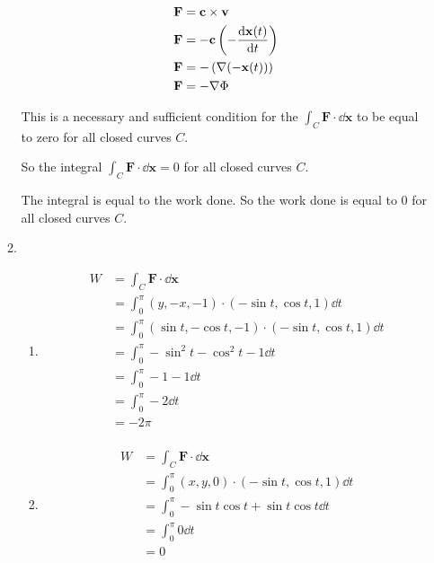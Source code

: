 \documentclass[10pt,\jkfside,a4paper]{article}
\begin{document}
\begin{enumerate}
\begin{enumerate}[label=(\roman*)]
\begin{equation}
\begin{split}
\mathbf{F} &= \mathbf{c}\times\mathbf{v} \\
\mathbf{F} &= -\mathbf{c}\left(-\dv{\mathbf{x}(t)}{t}\right) \\
\mathbf{F} &= -\left(\nabla(-\mathbf{x}(t))\right) \\
\mathbf{F} &= -\nabla\Phi \\
\end{split}
\end{equation}

This is a necessary and sufficient condition for the $\int_C \mathbf{F}\cdot \dd{\mathbf{x}}$ to be 
equal to zero for all closed curves $C$.

So the integral $\int_C \mathbf{F}\cdot \dd{\mathbf{x}} = 0$ for 
all closed curves $C$.

The integral is equal to the work done. So the work done is equal to 0 for all closed curves $C$.

\item 

\begin{enumerate}[label=(\alph*)]

\item

\begin{equation}
\begin{split}
W &= \int_C \mathbf{F} \cdot \dd{\mathbf{x}} \\
  &= \int^\pi_0 (y, -x, -1)  \cdot (-\sin t, \cos t, 1) \dd{t} \\
  &= \int^\pi_0 (\sin t, -\cos t, -1)  \cdot (-\sin t, \cos t, 1) \dd{t} \\
  &= \int^\pi_0 -\sin^2 t - \cos^2 t - 1 \dd{t} \\
  &= \int^\pi_0 -1 - 1 \dd{t} \\
  &= \int^\pi_0 -2 \dd{t} \\
  &= -2\pi \\
\end{split}
\end{equation}

\item 

\begin{equation}
\begin{split}
W &= \int_C \mathbf{F} \cdot \dd{\mathbf{x}} \\
  &= \int^\pi_0 (x, y, 0) \cdot (-\sin t, \cos t, 1) \dd{t} \\
  &= \int^\pi_0 -\sin t \cos t + \sin t \cos t \dd{t} \\
  &= \int^\pi_0 0 \dd{t} \\
  &= 0 \\
\end{split}
\end{equation}


\end{enumerate}
\end{enumerate}
\end{enumerate}
\end{document}
